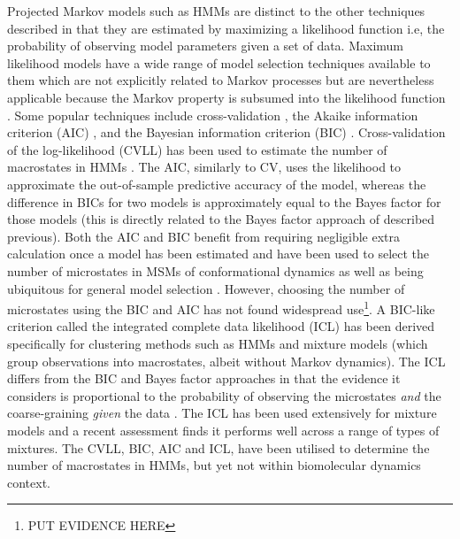 Projected Markov models such as HMMs are distinct to the other techniques described in that they are estimated by maximizing a likelihood function \cite{wuProjectedMetastableMarkov2015, noeProjectedHiddenMarkov2013a} i.e, the probability of observing model parameters given a set of data.  Maximum likelihood models have a wide range of model selection techniques available to them which are not explicitly related to Markov processes but are nevertheless applicable because the Markov property is subsumed into the likelihood function \cite[chapter 7]{friedman2001elements}\cite{milliganExaminationProceduresDetermining1985, mclachlanFiniteMixtureModels2000}.  Some popular techniques include cross-validation \cite{arlotSurveyCrossvalidationProcedures2009}, the Akaike information criterion (AIC) \cite{akaikeInformationTheoryExtension1998}, and the  Bayesian information criterion (BIC) \cite{schwarzEstimatingDimensionModel1978a}. Cross-validation of the log-likelihood (CVLL) has been used to estimate the number of macrostates in HMMs \cite{celeuxSelectingHiddenMarkov2008}. The AIC, similarly to CV, uses the likelihood to approximate the out-of-sample predictive accuracy of the model, whereas the difference in BICs for two models is approximately equal to the Bayes factor for those models (this is directly related to the Bayes factor approach of \cite{bacalladoBayesianComparisonMarkov2009a} described previous). Both the AIC and BIC benefit from requiring negligible extra calculation once a model has been estimated and have been used to select the number of microstates in MSMs of conformational dynamics \cite{mcgibbonStatisticalModelSelection2014a} as well as being ubiquitous for general model selection \cite[chapter 7]{friedman2001elements}. However, choosing the number of microstates using the BIC and AIC has not found widespread use\footnote{PUT EVIDENCE HERE}. A BIC-like criterion called the integrated complete data likelihood (ICL) \cite{biernackiAssessingMixtureModel2000a} has been derived specifically for clustering methods such as HMMs and mixture models \cite{mclachlanFiniteMixtureModels2000} (which  group observations into macrostates, albeit without Markov dynamics). The ICL differs from the BIC and Bayes factor approaches in that the evidence it considers is proportional to the probability of observing the microstates \emph{and} the coarse-graining \emph{given} the data \cite{biernackiAssessingMixtureModel2000a,mclachlanFiniteMixtureModels2000}.  The ICL has been used extensively \cite{mclachlanFiniteMixtureModels2000} for mixture models and a recent assessment \cite{brochadoDeterminingNumberComponents2020} finds it performs well across a range of types of mixtures. The CVLL, BIC, AIC and ICL, have been utilised to determine the number of macrostates in HMMs, but yet not within biomolecular dynamics context.  


